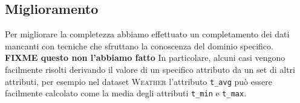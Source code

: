 \subsection{Miglioramento}

Per migliorare la completezza abbiamo effettuato un completamento dei dati 
mancanti con tecniche che sfruttano la conoscenza del dominio specifico.\\
\textbf{FIXME questo non l'abbiamo fatto} In particolare, alcuni casi vengono 
facilmente risolti derivando il valore di un specifico attributo da un set di 
altri attributi, per esempio nel dataset \textsc{Weather} l'attributo 
\texttt{t\_avg} può essere facilmente calcolato come la media degli attributi 
\texttt{t\_min} e \texttt{t\_max}.

